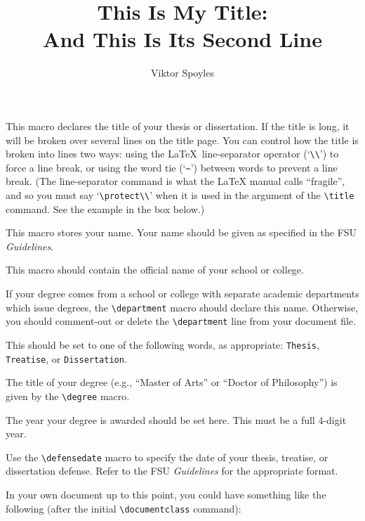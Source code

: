 \documentclass[11pt,letterpaper]{ltxdockit}[2011/03/25]
\newcommand*{\booktitle}[1]{\textit{#1}}
\newcommand*{\complit}[1]{\texttt{#1}}
\renewcommand{\-}{\discretionary{}{}{}}
\newenvironment*{macrolist}
  {\list{}{%
      \setlength{\labelwidth}{1.5in}
      \setlength{\labelsep}{10pt}
      \setlength{\leftmargin}{0pt}
      \setlength{\parsep}{0pt}
      \setlength{\listparindent}{\parindent}
      \renewcommand*{\makelabel}[1]{{\setbox0=\hbox{\parbox[t]{1.5in}{\raggedleft\leavevmode\marglistfont##1}}\dp0=0pt\box0}}}}
  {\endlist}
\def\cmditem#1{\cmd{#1}\\}
\def\macroitems#1{\item[\listofitems{\cmditem}{#1}]}
\begin{document}
\begin{macrolist}
\macroitems{title}
This macro declares the title of your
thesis or dissertation.  If the title is long, it will be broken over
several lines on the title page.  You can control how the title
is broken into lines two ways:
using the \LaTeX\ line-separator operator (`\verb+\\+') to force
a line break, or using the word tie (`\verb+~+') between words
to prevent a line break.  (The line-separator command is what the
\LaTeX{} manual calls ``fragile'', and so you must say
`\verb+\protect\\+' when it is used in the argument of the
\verb|\title| command. See the example in the box below.)

\macroitems{author}
This macro stores your name.  Your name
should be given as specified in the FSU \booktitle{Guidelines}.

\macroitems{college}
This macro should contain the official name of your
school or college.

\macroitems{department}
If your degree comes from a school or college with separate academic
departments which issue degrees,
the \verb|\department| macro should declare this name.  Otherwise, you
should comment-out or delete the \verb|\department| line from your
document file.

\macroitems{manuscripttype}
This should be set to one of the following words, as
appropriate:
\complit{Thesis}, \complit{Treatise}, or \complit{Dissertation}.

\macroitems{degree}
The title of your degree (e.g., ``Master
of Arts'' or ``Doctor of Philosophy'') is given by the \verb|\degree|
macro.

\macroitems{degreeyear}
The year your degree is awarded
should be set here.  This must be a full 4-digit year.

\macroitems{defensedate}
Use the \verb|\defensedate| macro to specify the
date of your thesis,
treatise, or dissertation defense.  Refer to the FSU
\booktitle{Guidelines} for the appropriate format.

\end{macrolist}

\noindent 
In your own document up to this point, you could have something like the
following (after the initial \verb|\documentclass| command):
\begin{ltxexample}
\title{This Is My Title:\protect\\ And This Is Its Second Line}
\author{Viktor Spoyles}
\end{ltxexample}
\end{document}
